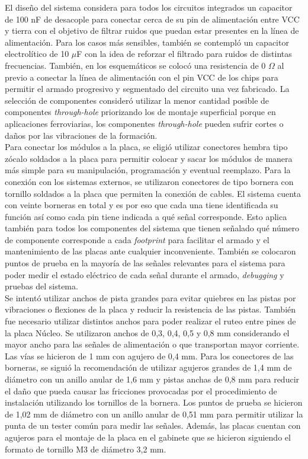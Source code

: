 El diseño del sistema considera para todos los circuitos integrados un capacitor de 100 nF de desacople para conectar cerca de su pin de alimentación entre VCC y tierra con el objetivo de filtrar ruidos que puedan estar presentes en la línea de alimentación. Para los casos más sensibles, también se contempló un capacitor electrolítico de 10 $\mu$F con la idea de reforzar el filtrado para ruidos de distintas frecuencias. También, en los esquemáticos se colocó una resistencia de 0 $\Omega$ al previo a conectar la línea de alimentación con el pin VCC de los chips para permitir el armado progresivo y segmentado del circuito una vez fabricado.  La selección de componentes consideró utilizar la menor cantidad posible de componentes \textit{through-hole} priorizando los de montaje superficial porque en aplicaciones ferroviarias, los componentes \textit{through-hole} pueden sufrir cortes o daños por las vibraciones de la formación.\\

Para conectar los módulos a la placa, se eligió utilizar conectores hembra tipo zócalo soldados a la placa para permitir colocar y sacar los módulos de manera más simple para su manipulación, programación y eventual reemplazo. Para la conexión con los sistemas externos, se utilizaron conectores de tipo bornera con tornillo soldados a la placa que permiten la conexión de cables. El sistema cuenta con veinte borneras en total y es por eso que cada una tiene identificada su función así como cada pin tiene indicada a qué señal corresponde. Esto aplica también para todos los componentes del sistema que tienen señalado qué número de componente corresponde a cada \textit{footprint} para facilitar el armado y el mantenimiento de las placas ante cualquier inconveniente. También se colocaron puntos de prueba en la mayoría de las señales relevantes para el sistema para poder medir el estado eléctrico de cada señal durante el armado, \textit{debugging} y pruebas del sistema. \\



Se intentó utilizar anchos de pista grandes para evitar quiebres en las pistas por vibraciones o flexiones de la placa y reducir la resistencia de las pistas. También fue necesario utilizar distintos anchos para poder realizar el ruteo entre pines de la placa Núcleo. Se utilizaron anchos de 0,3, 0,4, 0,5 y 0,8 mm considerando el mayor ancho para las señales de alimentación o que transportan mayor corriente. Las vías se hicieron de 1 mm con agujero de 0,4 mm. Para los conectores de las borneras, se siguió la recomendación de utilizar agujeros grandes de 1,4 mm de diámetro con un anillo anular de 1,6 mm  y pistas anchas de 0,8 mm para reducir el daño que pueda causar las fricciones provocadas por el procedimiento de instalación utilizando los tornillos de la bornera. Los puntos de prueba se hicieron de 1,02 mm de diámetro con un anillo anular de 0,51 mm para permitir utilizar la punta de un tester común para medir las señales. Además, las placas cuentan con agujeros para el montaje de la placa en el gabinete que se hicieron siguiendo el formato de tornillo M3 de diámetro 3,2 mm. \\

